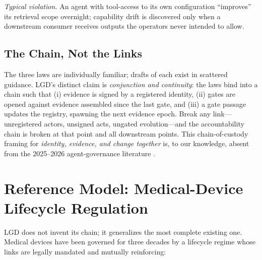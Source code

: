 \documentclass[12pt]{article}
\begin{document}
\emph{Typical violation.} An agent with tool-access to its own configuration ``improves'' its retrieval scope overnight; capability drift is discovered only when a downstream consumer receives outputs the operators never intended to allow.

\subsection{The Chain, Not the Links}

The three laws are individually familiar; drafts of each exist in scattered guidance. LGD's distinct claim is \emph{conjunction and continuity}: the laws bind into a chain such that (i) evidence is signed by a registered identity, (ii) gates are opened against evidence assembled since the last gate, and (iii) a gate passage updates the registry, spawning the next evidence epoch. Break any link---unregistered actors, unsigned acts, ungated evolution---and the accountability chain is broken at that point and all downstream points. This chain-of-custody framing for \emph{identity, evidence, and change together} is, to our knowledge, absent from the 2025--2026 agent-governance literature \cite{survey2508,survey2604}.

\section{Reference Model: Medical-Device Lifecycle Regulation}\label{sec:refmodel}

LGD does not invent its chain; it generalizes the most complete existing one. Medical devices have been governed for three decades by a lifecycle regime whose links are legally mandated and mutually reinforcing:
\end{document}
